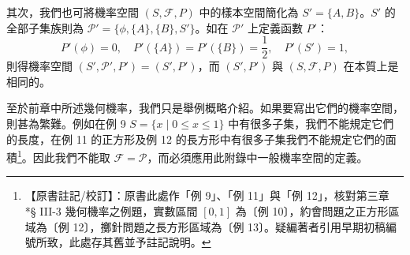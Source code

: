 其次，我們也可將機率空間 $(S, \mathscr{F}, P)$ 中的樣本空間簡化為 $S' = \{A, B\}$。$S'$ 的全部子集族則為 $\mathscr{P}' = \{\phi, \{A\}, \{B\}, S'\}$。如在 $\mathscr{P}'$ 上定義函數 $P'$：
\[
P'(\phi) = 0, \quad P'(\{A\}) = P'(\{B\}) = \frac{1}{2}, \quad P'(S') = 1,
\]
則得機率空間 $(S', \mathscr{P}', P') = (S', P')$，而 $(S', P')$ 與 $(S, \mathscr{F}, P)$ 在本質上是相同的。

\enlargethispage{2\baselineskip}
至於前章中所述幾何機率，我們只是舉例概略介紹。如果要寫出它們的機率空間，則甚為繁難。例如在例 9 $S=\{x \mid 0 \le x \le 1\}$ 中有很多子集，我們不能規定它們的長度，在例 11 的正方形及例 12 的長方形中有很多子集我們不能規定它們的面積\label{note:b5-ch4-p139-geom-ex-num}\footnote{【原書註記/校訂】：原書此處作「例 9」、「例 11」與「例 12」，核對第三章 *§ III-3 幾何機率之例題，實數區間 $[0,1]$ 為〔例 10〕，約會問題之正方形區域為〔例 12〕，擲針問題之長方形區域為〔例 13〕。疑編著者引用早期初稿編號所致，此處存其舊並予註記說明。}。因此我們不能取 $\mathscr{F} = \mathscr{P}$，而必須應用此附錄中一般機率空間的定義。
